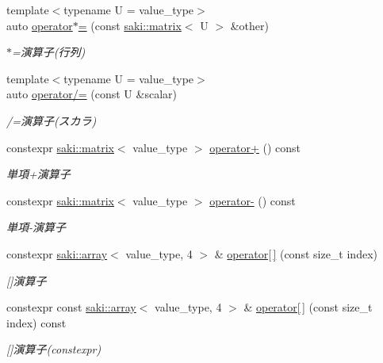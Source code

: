 \begin{DoxyCompactItemize}
{\footnotesize template$<$typename U  = value\+\_\+type$>$ }\\auto \mbox{\hyperlink{classsaki_1_1matrix_acb32e13e61d31a15341fbf2996f6428b}{operator$\ast$=}} (const \mbox{\hyperlink{classsaki_1_1matrix}{saki\+::matrix}}$<$ U $>$ \&other)
\begin{DoxyCompactList}\small\item\em $\ast$=演算子(行列) \end{DoxyCompactList}\item 
{\footnotesize template$<$typename U  = value\+\_\+type$>$ }\\auto \mbox{\hyperlink{classsaki_1_1matrix_af70c929f45bbea2192aab47d49882d3c}{operator/=}} (const U \&scalar)
\begin{DoxyCompactList}\small\item\em /=演算子(スカラ) \end{DoxyCompactList}\item 
constexpr \mbox{\hyperlink{classsaki_1_1matrix}{saki\+::matrix}}$<$ value\+\_\+type $>$ \mbox{\hyperlink{classsaki_1_1matrix_ada12f77277660f640f46c9bc7e67c04c}{operator+}} () const
\begin{DoxyCompactList}\small\item\em 単項+演算子 \end{DoxyCompactList}\item 
constexpr \mbox{\hyperlink{classsaki_1_1matrix}{saki\+::matrix}}$<$ value\+\_\+type $>$ \mbox{\hyperlink{classsaki_1_1matrix_a11aa55aa5c0efdc11c93c6a80188ac62}{operator-\/}} () const
\begin{DoxyCompactList}\small\item\em 単項-\/演算子 \end{DoxyCompactList}\item 
constexpr \mbox{\hyperlink{classsaki_1_1array}{saki\+::array}}$<$ value\+\_\+type, 4 $>$ \& \mbox{\hyperlink{classsaki_1_1matrix_a9438f349876b7932a5c3c58a713e3e00}{operator\mbox{[}$\,$\mbox{]}}} (const size\+\_\+t index)
\begin{DoxyCompactList}\small\item\em \mbox{[}\mbox{]}演算子 \end{DoxyCompactList}\item 
constexpr const \mbox{\hyperlink{classsaki_1_1array}{saki\+::array}}$<$ value\+\_\+type, 4 $>$ \& \mbox{\hyperlink{classsaki_1_1matrix_a1a326fe310df8da04d32200dd6ae1e64}{operator\mbox{[}$\,$\mbox{]}}} (const size\+\_\+t index) const
\begin{DoxyCompactList}\small\item\em \mbox{[}\mbox{]}演算子(constexpr) \end{DoxyCompactList}\item 

\end{DoxyCompactItemize}

